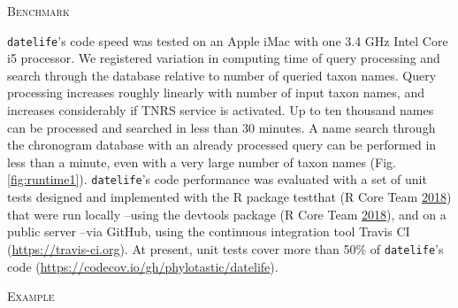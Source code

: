 \documentclass[]{article}
\begin{document}
\begin{center}
\textsc{Benchmark}
\end{center}

\texttt{datelife}'s code speed was tested on an Apple iMac
with one 3.4 GHz Intel Core i5 processor.
We registered variation in computing time of query processing and search through the database relative to number of queried taxon names.
Query processing increases roughly linearly with number of input taxon names, and
increases considerably if TNRS service is activated. Up to ten thousand names can be processed and searched in less than 30 minutes. A name search through the chronogram database with an already processed query can be performed in less than a minute, even with a very large number of taxon names (Fig. \ref{fig:runtime1}).
\texttt{datelife}'s code performance was evaluated with a set of unit tests designed and
implemented with the R package testthat (R Core Team \protect\hyperlink{ref-RCoreTeam2018}{2018}) that were run locally
--using the devtools package (R Core Team \protect\hyperlink{ref-RCoreTeam2018}{2018}), and on a public server --via
GitHub, using the continuous integration tool Travis CI (\url{https://travis-ci.org}). At
present, unit tests cover more than 50\% of \texttt{datelife}'s code (\url{https://codecov.io/gh/phylotastic/datelife}).

\begin{center}
\textsc{Example}
\end{center}
\end{document}
